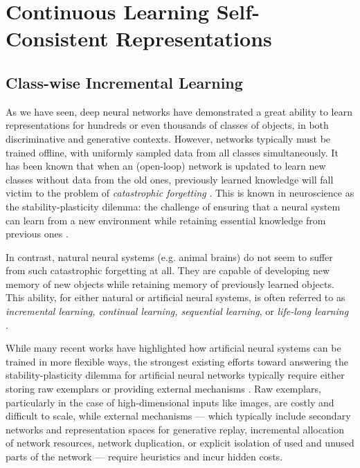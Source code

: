 \documentclass[../../book-main.tex]{subfiles}
\begin{document}
\section{Continuous Learning Self-Consistent Representations}
\label{sec:continuous}

\subsection{Class-wise Incremental Learning}
\label{sec:class-wise-incremental}

As we have seen, deep neural networks have demonstrated a great ability to learn representations for hundreds or even thousands of classes of objects, in both discriminative and generative contexts. However, networks typically must be trained offline, with uniformly sampled data from all classes simultaneously. It has been known that when an (open-loop) network is updated to learn new classes without data from the old ones, previously learned knowledge will fall victim to the problem of {\em catastrophic forgetting} \cite{McCloskey1989catastrophic}. This is known in neuroscience as the stability-plasticity dilemma: the challenge of ensuring that a neural system can learn from a new environment while retaining essential knowledge from previous ones \cite{Grossberg1987CompetitiveLF}.

In contrast, natural neural systems (e.g. animal brains) do not seem to suffer from such catastrophic forgetting at all. They are capable of developing new memory of new objects while retaining memory of previously learned objects. This ability, for either natural or artificial neural systems, is often referred to as {\em  incremental learning, continual learning, sequential learning}, or {\em life-long learning}~ \cite{controlled-forgetting}.



While many recent works have highlighted how artificial neural systems can be  trained in more flexible ways, the strongest existing efforts toward answering the stability-plasticity dilemma for artificial neural networks typically require either storing raw exemplars \cite{icarl,chaudhry2019tiny} or providing external mechanisms \cite{EWC}. Raw exemplars, particularly in the case of high-dimensional inputs like images, are costly and difficult to scale, while external mechanisms --- which typically include secondary networks and representation spaces for generative replay, incremental allocation of network resources, network duplication, or explicit isolation of used and unused parts of the network --- require heuristics and incur hidden costs.
\end{document}
